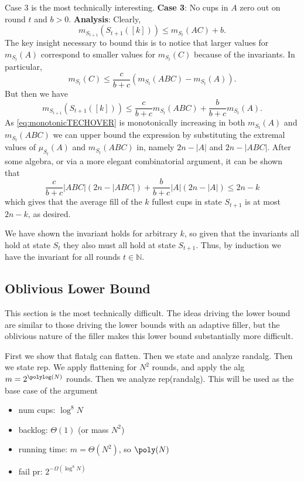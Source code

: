 Case 3 is the most technically interesting.
\textbf{Case 3}:
No cups in $A$ zero out on round $t$ and $b > 0$.
\textbf{Analysis}:
Clearly,
$$m_{S_{t+1}}(S_{t+1}([k])) \le m_{S_t}(AC) + b.$$
The key insight necessary to bound this is to notice that larger values for
$m_{S_t}(A)$ correspond to smaller values for $m_{S_t}(C)$ because of the
invariants.
In particular, 
$$m_{S_t}(C) \le \frac{c}{b+c}(m_{S_t}(ABC) - m_{S_t}(A)).$$
But then we have 
\begin{equation}
  \label{eq:monotonicTECHOVER}
  m_{S_{t+1}}(S_{t+1}([k])) \le \frac{c}{b+c}m_{S_t}(ABC) + \frac{b}{b+c}m_{S_t}(A).
\end{equation}
As \eqref{eq:monotonicTECHOVER} is monotonically increasing in
both $m_{S_t}(A)$ and $m_{S_t}(ABC)$ we can upper bound the
expression by substituting the extremal values of $\mu_{S_t}(A)$
and $m_{S_t}(ABC)$ in, namely $2n-|A|$ and $2n-|ABC|$.
After some algebra, or via a more elegant combinatorial argument,
it can be shown that 
$$\frac{c}{b+c}|ABC|(2n-|ABC|) + \frac{b}{b+c}|A|(2n-|A|) \le
2n-k$$
which gives that the average fill of the $k$ fullest cups in
state $S_{t+1}$ is at most $2n-k$, as desired.

We have shown the invariant holds for arbitrary $k$, so given that the
invariants all hold at state $S_t$ they also must all hold at state $S_{t+1}$.
Thus, by induction we have the invariant for all rounds $t\in\mathbb{N}$.

\subsection{Oblivious Lower Bound}

This section is the most technically difficult. The ideas driving
the lower bound are similar to those driving the lower bounds
with an adaptive filler, but the oblivious nature of the filler
makes this lower bound substantially more difficult. 

First we show that flatalg can flatten.
Then we state and analyze randalg.
Then we state rep. We apply flattening for $N^2$ rounds, and
apply the alg $m = 2^{\polylog(N)}$ rounds.
Then we analyze rep(randalg).
This will be used as the base case of the argument
\begin{itemize}
  \item num cups: $\log^8 N$
  \item backlog: $\Theta(1)$ (or mass $N^2$)
  \item running time: $m=\Theta(N^2)$, so $\poly(N)$
  \item fail pr: $2^{-\Omega(\log^8 N)}$
\end{itemize}

